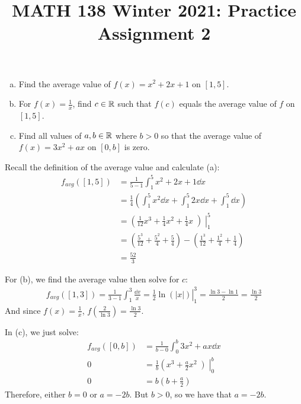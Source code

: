 \documentclass{agony}
\title{MATH 138 Winter 2021: Practice Assignment 2}
\begin{document}
\begin{prob}
  \begin{enumerate}[(a)]
    \item Find the average value of $f(x) = x^2 + 2x + 1$ on $[1,5]$.
    \item For $f(x) = \frac1x$, find $c\in\mathbb{R}$ such that
          $f(c)$ equals the average value of $f$ on $[1,5]$.
    \item Find all values of $a,b\in\mathbb{R}$ where $b>0$ so that
          the average value of $f(x) = 3x^2 + ax$ on $[0,b]$ is zero.
  \end{enumerate}
\end{prob}
\begin{sol}
  Recall the definition of the average value and calculate (a):
  \begin{align*}
    f_{avg}([1,5])
     & = \frac{1}{5-1}\int_1^5 x^2 + 2x + 1 \dd{x}                                          \\
     & = \frac{1}{4}\left(\int_1^5 x^2 \dd{x} + \int_1^5 2x \dd{x} + \int_1^5 \dd x \right) \\
     & = \left(\frac{1}{12}x^3 + \frac{1}{4}x^2 + \frac{1}{4}x\middle)\right|_1^5           \\
     & = \left(\frac{5^3}{12}+\frac{5^2}{4}+\frac{5}{4}\right)
    - \left(\frac{1^3}{12}+\frac{1^2}{4}+\frac{1}{4}\right)                                 \\
     & = \frac{52}{3}
  \end{align*}

  For (b), we find the average value then solve for $c$:
  \begin{align*}
    f_{avg}([1,3])
    = \frac{1}{3-1}\int_1^3 \frac{\dd{x}}{x}
    = \left.\frac{1}{2}\ln(|x|)\right|_1^3
    = \frac{\ln3-\ln1}{2}
    = \frac{\ln3}{2}
  \end{align*}
  And since $f(x) = \frac{1}{x}$, $f(\frac{2}{\ln3}) = \frac{\ln3}{2}$.

  In (c), we just solve:
  \begin{align*}
    f_{avg}([0,b]) & = \frac{1}{b-0} \int_0^b 3x^2 + ax \dd{x}                  \\
    0              & = \frac{1}{b}\left(x^3 + \frac{a}{2}x^2\middle)\right|_0^b \\
    0              & = b\left(b + \frac{a}{2}\right)
  \end{align*}
  Therefore, either $b = 0$ or $a = -2b$.
  But $b > 0$, so we have that $a = -2b$.
\end{sol}
\end{document}
